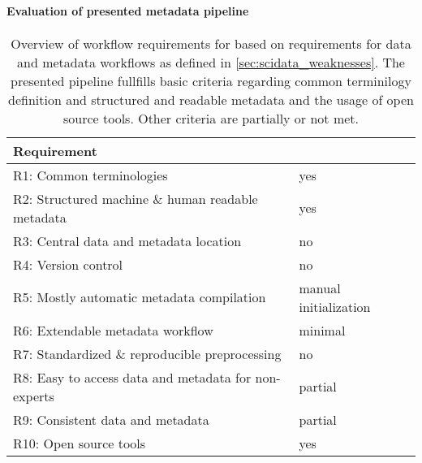 \paragraph{Evaluation of presented metadata pipeline}
\begin{table}[]
\begin{tabular}{|l|l|}
\hline
Requirement                                          &  \cite{Brochier_2018} \\  \hline
R1: Common terminologies                             &  yes \\ \hline
R2: Structured machine \& human readable metadata    &  yes \\ \hline
R3: Central data and metadata location               &  no \\ \hline
R4: Version control                                  &  no \\ \hline
R5: Mostly automatic metadata compilation            &  manual initialization \\ \hline
R6: Extendable metadata workflow                     &  minimal \\ \hline
R7: Standardized \& reproducible preprocessing       &  no \\ \hline
R8: Easy to access data and metadata for non-experts &  partial \\ \hline
R9: Consistent data and metadata                     &  partial \\ \hline
R10: Open source tools                               &  yes \\ \hline
\end{tabular}
\caption[Overview of workflow requirements for \cite{Brochier_2018}]{Overview of workflow requirements for \cite{Brochier_2018} based on requirements for data and metadata workflows as defined in \ref{sec:scidata_weaknesses}. The presented pipeline fullfills basic criteria regarding common terminilogy definition and structured and readable metadata and the usage of open source tools. Other criteria are partially or not met.}
\label{tab:requirement_check_brochier}
\end{table}



% 
